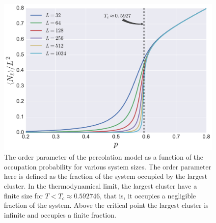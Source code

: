 \begin{figure}
\begin{center}
    \includegraphics[scale=0.4]{chapters/ch2-crit/figs/isoperco2}
\end{center}
\caption{The order parameter of the percolation model as a function of the
    occupation probability for various system sizes. The order parameter here
    is defined as the fraction of the system occupied by the largest cluster.
    In the thermodynamical limit, the largest cluster have a finite size for
    $T<T_c\approx 0.592746$, that is, it occupies a negligible fraction of the
    system. Above the critical point the largest cluster is infinite and occupies
    a finite fraction.}
\label{fig:isoperco2}
\end{figure}

